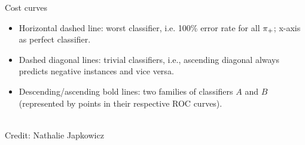 \begin{vbframe}{Cost curves}

\begin{footnotesize}

\begin{itemize}
  \item Horizontal dashed line: worst classifier, i.e. 100\% error rate for all 
  $\pi_{+}$; x-axis as perfect classifier.
  \item Dashed diagonal lines: trivial classifiers, i.e., ascending diagonal 
  always predicts negative instances and vice versa.
  \item Descending/ascending bold lines:
  two families of classifiers $A$ and $B$ (represented by points in their 
  respective ROC curves).
\end{itemize}

\end{footnotesize}

\begin{center}
  \tiny{\\ Credit: Nathalie Japkowicz  \\}
\end{center}

\end{vbframe}


%
%
%

